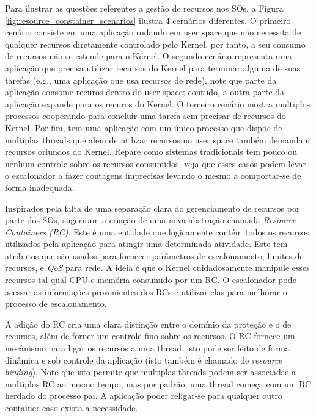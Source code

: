 Para ilustrar as questões referentes a gestão de recursos nos SOs, a Figura
\ref{fig:resource_constainer_scenarios} ilustra 4 cernários diferentes. O
primeiro cenário consiste em uma aplicação rodando em user space que não
necessita de qualquer recursos diretamente controlado pelo Kernel, por tanto, a
seu consumo de recursos não se estende para o Kernel. O segundo cenário
representa uma aplicação que precisa utilizar recursos do Kernel para terminar
alguma de suas tarefas (e.g., uma aplicação que usa recursos de rede), note que
parte da aplicação consome recuros dentro do user space; contudo, a outra parte
da aplicação expande para os recuros do Kernel. O terceiro cenário mostra
multiplos processos cooperando para concluir uma tarefa sem precisar de
recursos do Kernel. Por fim, tem uma aplicação com um único processo que dispõe
de multiplas threads que além de utilizar recursos no user space também
demandam recursos oriundos do Kernel. Repare como sistemas tradicionais tem
pouco ou nenhum controle sobre os recursos consumidos, veja que esses casos
podem levar o escalonador a fazer contagens imprecisas levando o mesmo a
comportar-se de forma inadequada.

Inspirados pela falta de uma separação clara do gerenciamento de recursos por
parte dos SOs, \cite{resourcecontainers} sugeriram a criação de uma nova
abstração chamada \emph{Resource Containers (RC)}. Este é uma entidade que
logicamente contém todos os recursos utilizados pela aplicação para atingir uma
determinada atividade. Este tem atributos que são usados para fornecer
parâmetros de escalonamento, limites de recursos, e \emph{QoS} para rede. A
ideia é que o Kernel cuidadosamente manipule esses recursos tal qual CPU e
memória consumido por um RC. O escalonador pode acessar as informações
provenientes dos RCs e utilizar elas para melhorar o processo de escalonamento.

A adição do RC cria uma clara distinção entre o domínio da proteção e o de
recursos, além de forner um controle fino sobre os recursos. O RC fornece um
mecânismo para ligar os recursos a uma thread, isto pode ser feito de forma
dinâmica e sob controle da aplicação (isto também é chamado de \emph{resource
binding}). Note que isto permite que multiplas threads podem ser associadas a
multiplos RC ao mesmo tempo, mas por padrão, uma thread começa com um RC
herdado do processo pai. A aplicação poder religar-se para qualquer outro
container caso exista a necessidade.

